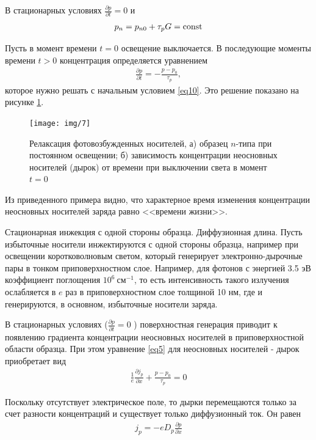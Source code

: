 В стационарных условиях $\frac{\partial p}{\partial t}=0$ и
\begin{gather}
	\label{eq10}
	p_{n}=p_{n 0}+\tau_{p} G=\operatorname{const}
\end{gather}

Пусть в момент времени $t = 0$ освещение выключается. В последующие моменты времени $t > 0$ концентрация определяется уравнением
\begin{gather}
	\label{eq11}
	\frac{\partial p}{\partial t}=-\frac{p-p_{0}}{\tau_{p}},
\end{gather}
которое нужно решать с начальным условием \eqref{eq10}. Это решение показано на рисунке \ref{fig:figure6}.

\begin{figure}[H]
	\centering
	\texttt{[image: img/7]}
	\caption{Релаксация фотовозбужденных носителей, а) образец $n$-типа при постоянном освещении; б) зависимость концентрации неосновных носителей (дырок) от времени при выключении света в момент $t = 0$}
	\label{fig:figure6}
\end{figure}

Из приведенного примера видно, что характерное время изменения концентрации неосновных носителей заряда равно <<времени жизни>>.

Стационарная инжекция с одной стороны образца. Диффузионная длина. Пусть избыточные носители инжектируются с одной стороны образца, например при освещении коротковолновым светом, который генерирует электронно-дырочные пары в тонком приповерхностном слое. Например, для фотонов с энергией 3.5 эВ коэффициент поглощения $10^6\ \text{см}^{-1}$, то есть интенсивность такого излучения ослабляется в $e$ раз в приповерхностном слое толщиной 10 нм, где и генерируются, в основном, избыточные носители заряда.

В стационарных условиях ($\frac{\partial p}{\partial t}=0$ ) поверхностная генерация приводит к появлению градиента концентрации неосновных носителей в приповерхностной области образца. При этом уравнение \eqref{eq5} для неосновных носителей - дырок приобретает вид
\begin{gather}
	\label{eq13}
	\frac{1}{e} \frac{\partial j_{p}}{\partial x}+\frac{p-p_{0}}{\tau_{p}}=0
\end{gather}

Поскольку отсутствует электрическое поле, то дырки перемещаются только за счет разности концентраций и существует только диффузионный ток. Он равен
\begin{gather}
	\label{eq14}
	j_{p}=-e D_{p} \frac{\partial p}{\partial x}
\end{gather}

